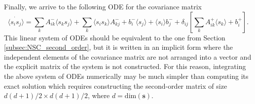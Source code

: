 \documentclass[a4paper, 11pt]{article}
\begin{document}
Finally, we arrive to the following ODE for the covariance matrix
\begin{equation}\label{eqn:o2_ODEs_}
  \dot{\langle s_is_j\rangle} = \sum_kA^-_{ik}\langle s_ks_j\rangle + \sum_k\langle s_is_k\rangle A^-_{kj} + b^-_i\langle s_j\rangle + \langle s_i\rangle b^-_j + \delta_{ij}\left[\sum_kA^+_{ik}\langle s_k\rangle + b^+_i\right].
\end{equation}
This linear system of ODEs should be equivalent to the one from Section \ref{subsec:NSC_second_order}, but it is written in an implicit form where the independent elements of the covariance matrix are not arranged into a vector and the explicit matrix of the system is not constructed. For this reason, integrating the above system of ODEs numerically may be much simpler than computing its exact solution which requires constructing the second-order matrix of size $d(d+1)/2\times d(d+1)/2$, where $d=\text{dim}(\mathbf s)$.


\end{document}
